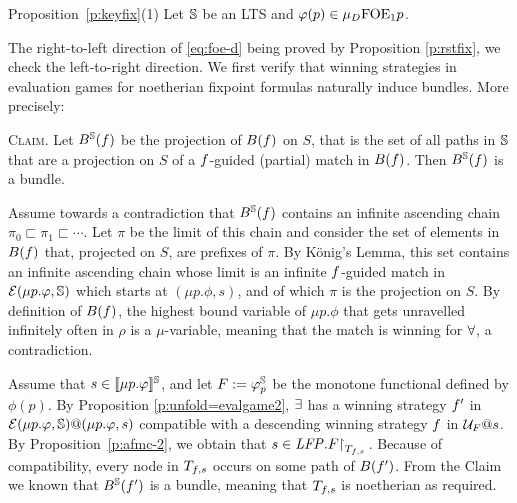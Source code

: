 
\begin{proofof}{Proposition~\ref{p:keyfix}(1)}
%    
Let $\mathbb{S}$ be an LTS and $\varphi(p) \in \mu_{D}\mathrm{FOE}_1{p}$. 

The right-to-left direction of \eqref{eq:foe-d} being proved by 
Proposition \ref{p:rstfix}, we check the left-to-right direction.
We first verify that winning strategies in evaluation games for noetherian 
fixpoint formulas naturally induce bundles. 
More precisely:
\medskip

\textsc{Claim.}
Let $B^{\mathbb{S}}(f)$ be the projection of $B(f)$ on $S$, that is the set
of all paths in $\mathbb{S}$ that are a projection on $S$ of a $f$-guided 
(partial) match in $B(f)$. Then $B^{\mathbb{S}}(f)$ is a bundle.
\medskip

\begin{pfclaim}
Assume towards a contradiction that $B^{\mathbb{S}}(f)$ contains an infinite 
ascending chain $\pi_{0} \sqsubset \pi_{1} \sqsubset \cdots$. 
Let $\pi$ be the limit of this chain and consider the set of elements in 
$B(f)$ that, projected on $S$, are prefixes of $\pi$. 
By  K\"{o}nig's Lemma, this set contains an infinite ascending chain whose 
limit is an infinite $f$-guided match in $\mathcal{E}(\mu p. \varphi,\mathbb{S})$
which starts at $(\mu p. \phi,s)$, and of which $\pi$ is the projection on $S$.
By definition of $B(f)$,  the highest bound variable of $\mu p. \phi$ 
that gets unravelled infinitely often in $\rho$ is a $\mu$-variable, meaning 
that the match is winning for $\forall$, a contradiction.
\end{pfclaim}

Assume that $s \in \llbracket\mu p.\varphi\rrbracket^{\mathbb{S}}$, and let $F \mathrel{:=}  \varphi_{p}^{\mathbb{S}}$ be the monotone functional defined by $\phi(p)$.
By Proposition \ref{p:unfold=evalgame2}, $\exists$ has a winning strategy 
$f'$ in $\mathcal{E}(\mu p.\varphi,\mathbb{S})@(\mu p.\varphi,s)$ compatible with a descending winning strategy $f$ in $\mathcal{U}_{F}@s$.
By Proposition~\ref{p:afmc-2}, we obtain 
that $s \in \mathit{LFP}. F{\upharpoonright}_{T_{f,s}}\,$. 
Because of compatibility, every node in $T_{f, s}$ occurs on some path of 
$B(f')$. 
From the Claim
we known that $B^{\mathbb{S}}(f')$ is a bundle, meaning that  $T_{f, s}$ is
noetherian as required. 
\end{proofof}
